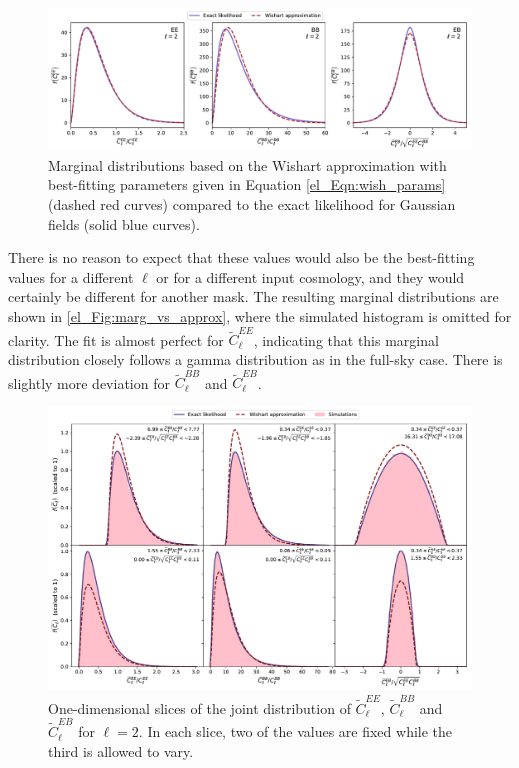 \begin{figure}
    \includegraphics[width=\columnwidth]{marg_vs_approx}
    \caption{Marginal distributions based on the Wishart approximation with best-fitting parameters given in Equation \eqref{el_Eqn:wish_params} (dashed red curves) compared to the exact likelihood for Gaussian fields (solid blue curves).}
    \label{el_Fig:marg_vs_approx}
\end{figure}

There is no reason to expect that these values would also be the best-fitting values for a different $\ell$ or for a different input cosmology, and they would certainly be different for another mask. The resulting marginal distributions are shown in \autoref{el_Fig:marg_vs_approx}, where the simulated histogram is omitted for clarity. The fit is almost perfect for $\widetilde{C}_\ell^{EE}$, indicating that this marginal distribution closely follows a gamma distribution as in the full-sky case. There is slightly more deviation for $\widetilde{C}_\ell^{BB}$ and $\widetilde{C}_\ell^{EB}$.

\begin{figure}
    \includegraphics[width=\columnwidth]{1dslices_vs_approx}
    \caption{One-dimensional slices of the joint distribution of $\widetilde{C}_\ell^{EE}$, $\widetilde{C}_\ell^{BB}$ and $\widetilde{C}_\ell^{EB}$ for $\ell = 2$. In each slice, two of the values are fixed while the third is allowed to vary.}
    \label{el_Fig:1dslices_vs_approx}
\end{figure}

